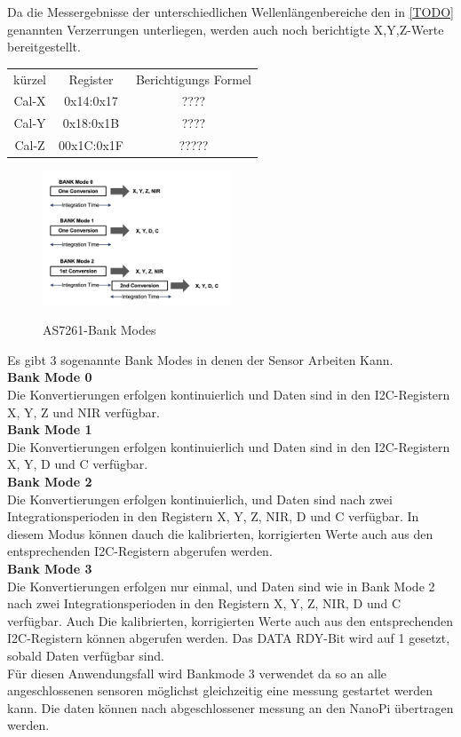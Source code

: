 Da die Messergebnisse der unterschiedlichen Wellenlängenbereiche den in \ref{TODO} genannten Verzerrungen unterliegen, werden auch noch berichtigte X,Y,Z-Werte bereitgestellt.

\begin{center}
\begin{tabular}{c c c}
 kürzel & Register & Berichtigungs Formel\\
 Cal-X & 0x14:0x17 & ???? \\ 
 Cal-Y & 0x18:0x1B & ???? \\  
 Cal-Z & 00x1C:0x1F & ????? \\  
\end{tabular}
\end{center}

\begin{figure}
\centering
\caption{AS7261-Bank Modes}
\includegraphics[width=0.5\textwidth]{img/AS7261-Bank_Modes.png}
\label{fig:AS7261-Bank_Modes}
\end{figure}

\noindent Es gibt 3 sogenannte Bank Modes in denen der Sensor Arbeiten Kann.\\
\textbf{Bank Mode 0}\\
Die Konvertierungen erfolgen kontinuierlich und Daten sind in den I2C-Registern X, Y, Z und NIR verfügbar.\\
\textbf{Bank Mode 1}\\
Die Konvertierungen erfolgen kontinuierlich und Daten sind in den I2C-Registern X, Y, D und C verfügbar.\\
\textbf{Bank Mode 2}\\
Die Konvertierungen erfolgen kontinuierlich, und Daten sind nach zwei Integrationsperioden in den Registern X, Y, Z, NIR, D und C verfügbar. 
In diesem Modus können dauch die kalibrierten, korrigierten Werte auch aus den entsprechenden I2C-Registern abgerufen werden.\\
\textbf{Bank Mode 3}\\
Die Konvertierungen erfolgen nur einmal, und Daten sind wie in Bank Mode 2 nach zwei Integrationsperioden in den Registern X, Y, Z, NIR, D und C verfügbar.
Auch Die kalibrierten, korrigierten Werte auch aus den entsprechenden I2C-Registern können abgerufen werden.
Das DATA RDY-Bit wird auf 1 gesetzt, sobald Daten verfügbar sind.\\
Für diesen Anwendungsfall wird Bankmode 3 verwendet da so an alle angeschlossenen sensoren möglichst gleichzeitig eine messung gestartet werden kann.
Die daten können nach abgeschlossener messung an den NanoPi übertragen werden.


